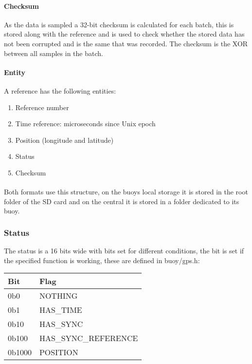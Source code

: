 \documentclass[a4paper]{article}
\begin{document}
\begin{multicols}{2}
    \paragraph{Checksum}
    As the data is sampled a 32-bit checksum is calculated for each
    batch, this is stored along with the reference and is used to check
    whether the stored data has not been corrupted and is the same that
    was recorded. The checksum is the XOR between all samples in the
    batch.

    \paragraph{Entity}
    A reference has the following entities:
    \begin{enumerate}
      \item Reference number
      \item Time reference: microseconds since Unix epoch
      \item Position (longitude and latitude)
      \item Status
      \item Checksum
    \end{enumerate}

    \paragraph{}
    Both formats use this structure, on the buoys local storage it is
    stored in the root folder of the SD card and on the central it is
    stored in a folder dedicated to its buoy.

    \subsubsection{Status} The status is a 16 bits wide with bits set for
    different conditions, the bit is set if the specified function is
    working, these are defined in buoy/gps.h: \\

    \vspace{1em}

    \begin{tabular}{|l|l|}
      \hline
      \bfseries Bit & \bfseries Flag \\ \hline
       0b0    &   NOTHING \\ \hline
       0b1    &   HAS\_TIME    \\ \hline
       0b10   &   HAS\_SYNC    \\ \hline
       0b100  &   HAS\_SYNC\_REFERENCE \\ \hline
       0b1000 &   POSITION \\ \hline
    \end{tabular}
    \label{tab:status_flags}


\end{multicols}
\end{document}
